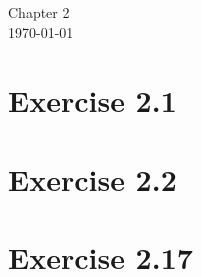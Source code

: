 \documentclass[12pt]{article}
\begin{document}
\begin{center}
{\Large Chapter 2}\\
\today
\end{center}
\section*{Exercise 2.1}
\section*{Exercise 2.2}
\section*{Exercise 2.17}
\end{document}
